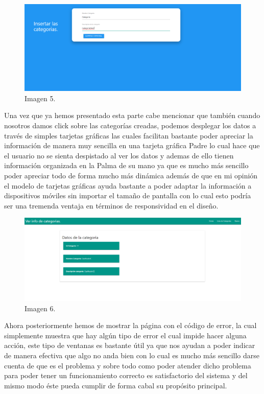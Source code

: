 \documentclass[10pt,a4paper]{article}
\begin{document}
\begin{figure}[h]
\centering
\includegraphics[width=13cm]{5}
\caption{Imagen 5.}
\label{fig:figure1}
\end{figure}

Una vez que ya hemos presentado esta parte cabe mencionar que también cuando nosotros damos click sobre las categorías creadas, podemos desplegar los datos a través de simples tarjetas gráficas las cuales facilitan bastante poder apreciar la información de manera muy sencilla en una tarjeta gráfica Padre lo cual hace que el usuario no se sienta despistado al ver los datos y ademas de ello tienen información organizada en la Palma de su mano ya que es mucho más sencillo poder apreciar todo de forma mucho más dinámica además de que en mi opinión el modelo de tarjetas gráficas ayuda bastante a poder adaptar la información a dispositivos móviles sin importar el tamaño de pantalla con lo cual esto podría ser una tremenda ventaja en términos de responsividad en el diseño.
\begin{figure}[h]
\centering
\includegraphics[width=13cm]{6}
\caption{Imagen 6.}
\label{fig:figure1}
\end{figure}

\vspace{60mm}

Ahora posteriormente hemos de mostrar la página con el código de error, la cual simplemente muestra que hay algún tipo de error el cual impide hacer alguna acción, este tipo de ventanas es bastante útil ya que nos ayudan a poder indicar de manera efectiva que algo no anda bien con lo cual es mucho más sencillo darse cuenta de que es el problema y sobre todo como poder atender dicho problema para poder tener un funcionamiento correcto es satisfactorio del sistema y del mismo modo éste pueda cumplir de forma cabal su propósito principal.
\end{document}
